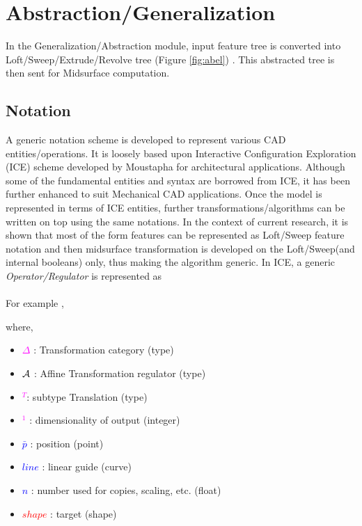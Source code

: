 \section{Abstraction/Generalization}
In the Generalization/Abstraction module, input feature tree is converted into Loft/Sweep/Extrude/Revolve tree (Figure \ref{fig:abel}) . This abstracted tree is then sent for Midsurface computation. 

\subsection{Notation}
A generic notation scheme is developed to represent various CAD entities/operations. It is loosely based upon Interactive Configuration Exploration  (ICE) scheme developed by Moustapha \cite{Hoda2005} for architectural applications. Although some of the fundamental entities and syntax are borrowed from ICE, it has been further enhanced to suit Mechanical CAD applications.  Once the model is represented in terms of ICE entities, further transformations/algorithms can be written on top using the same notations. In the context of current research, it is shown that most of the form features can be represented as Loft/Sweep feature notation and then midsurface transformation is developed on the Loft/Sweep(and internal booleans) only, thus making the algorithm generic. In ICE, a generic {\em Operator/Regulator} is represented as \\

{}\\

	 For example ,

	
	where,
		\begin{itemize}[noitemsep,topsep=0pt,parsep=0pt,partopsep=0pt,label={}]
		\item 	\textcolor{magenta}{$\Delta$} : Transformation category (type)
	     	\item 	\textcolor{magenta}{${\bf \mathcal{A}}$} : Affine Transformation regulator (type)
		\item  	\textcolor{magenta}{$^T$}: subtype Translation (type)
		 \item 	\textcolor{magenta}{$^1$} : dimensionality of output (integer)
	        \item 	\textcolor{blue}{ $\bar{p}$} : position (point)
  		\item  	\textcolor{blue}{$line$} : linear guide (curve)
		 \item  	\textcolor{blue}{$n$} : number used for copies, scaling, etc. (float)
		 \item  	\textcolor{red}{$shape$} : target (shape)
		\end{itemize}

